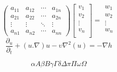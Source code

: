 \documentclass{article}
\begin{document}
\begin{equation*}
\begin{pmatrix}
a_{11} & a_{12} & \cdots & a_{1n} \\
a_{21} & a_{22} & \cdots & a_{2n} \\
\vdots  & \vdots  & \ddots & \vdots  \\
a_{n1} & a_{n2} & \cdots & a_{nn} 
\end{pmatrix}
%
  \begin{bmatrix}
    v_{1} \\
    v_{2} \\
    \vdots\\
    v_{n} \\
  \end{bmatrix} 
% 
=
\begin{matrix}
    w_{1} \\
    w_{2} \\
    \vdots\\
    w_{n} \\
  \end{matrix}
\end{equation*}
\begin{displaymath}
\frac{\partial_u}{\partial_t} + (u . \nabla)u-\upsilon\nabla^2(u)=-\nabla h
\end{displaymath}

\begin{displaymath}
\alpha A \beta B \gamma \Gamma \delta \Delta \pi \Pi \omega \Omega 
\end{displaymath}
\end{document}
